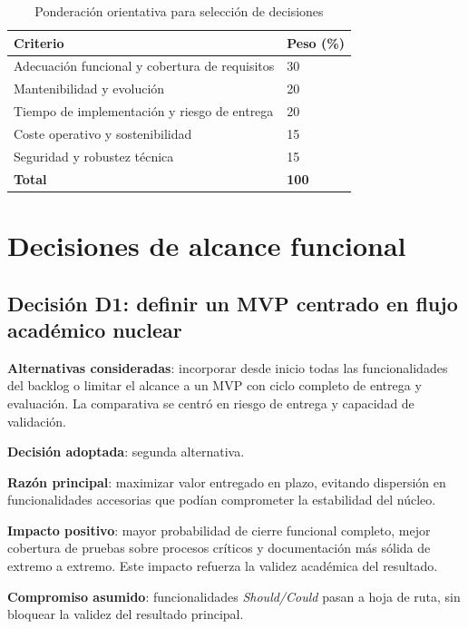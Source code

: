 \begin{table}[!htbp]
\centering
\begin{tabular}{|P{6.4cm}|P{2.5cm}|}
\hline
\textbf{Criterio} & \textbf{Peso (\%)} \\
\hline
Adecuaci\'on funcional y cobertura de requisitos & 30 \\
\hline
Mantenibilidad y evoluci\'on & 20 \\
\hline
Tiempo de implementaci\'on y riesgo de entrega & 20 \\
\hline
Coste operativo y sostenibilidad & 15 \\
\hline
Seguridad y robustez t\'ecnica & 15 \\
\hline
\textbf{Total} & \textbf{100} \\
\hline
\end{tabular}
\caption{Ponderaci\'on orientativa para selecci\'on de decisiones}
\label{tab:pesos-criterios}
\end{table}

\FloatBarrier
\section{Decisiones de alcance funcional}

\subsection{Decisi\'on D1: definir un MVP centrado en flujo acad\'emico nuclear}

\textbf{Alternativas consideradas}: incorporar desde inicio todas las funcionalidades del backlog o limitar el alcance a un MVP con ciclo completo de entrega y evaluaci\'on. La comparativa se centr\'o en riesgo de entrega y capacidad de validaci\'on.

\textbf{Decisi\'on adoptada}: segunda alternativa.

\textbf{Raz\'on principal}:
maximizar valor entregado en plazo,
evitando dispersi\'on en funcionalidades accesorias
que pod\'ian comprometer la estabilidad del n\'ucleo.

\textbf{Impacto positivo}: mayor probabilidad de cierre funcional completo, mejor cobertura de pruebas sobre procesos cr\'iticos y documentaci\'on m\'as s\'olida de extremo a extremo. Este impacto refuerza la validez acad\'emica del resultado.

\textbf{Compromiso asumido}:
funcionalidades \emph{Should/Could} pasan a hoja de ruta,
sin bloquear la validez del resultado principal.

